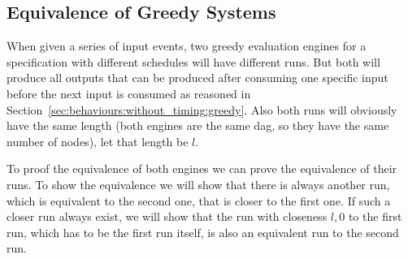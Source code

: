 \subsection{Equivalence of Greedy Systems}
\label{sec:behaviours:equivalence_without_timing:greedy}

When given a series of input events, two greedy evaluation engines for a specification with different schedules will have different runs.
But both will produce all outputs that can be produced after consuming one specific input before the next input is consumed as reasoned in Section~\ref{sec:behaviours:without_timing:greedy}.
Also both runs will obviously have the same length (both engines are the same \gls{dag}, so they have the same number of nodes), let that length be \(l\).

To proof the equivalence of both engines we can prove the equivalence of their runs.
To show the equivalence we will show that there is always another run, which is equivalent to the second one, that is closer to the first one.
If such a closer run always exist, we will show that the run with closeness \(l, 0\) to the first run, which has to be the first run itself, is also an equivalent run to the second run.

